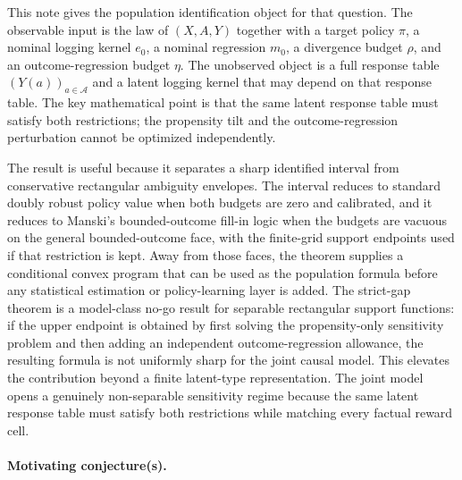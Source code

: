 \documentclass[11pt]{article}
\theoremstyle{definition}
\theoremstyle{plain}
\theoremstyle{remark}
\begin{document}
This note gives the population identification object for that question.  The
observable input is the law of $(X,A,Y)$ together with a target policy
$\pi$, a nominal logging kernel $e_0$, a nominal regression $m_0$, a divergence
budget $\rho$, and an outcome-regression budget $\eta$.  The unobserved object
is a full response table $(Y(a))_{a\in\mathcal A}$ and a latent logging kernel
that may depend on that response table.  The key mathematical point is that the
same latent response table must satisfy both restrictions; the propensity tilt
and the outcome-regression perturbation cannot be optimized independently.

The result is useful because it separates a sharp identified interval from
conservative rectangular ambiguity envelopes.  The interval reduces to standard
doubly robust policy value when both budgets are zero and calibrated, and it
reduces to Manski's bounded-outcome fill-in logic when the budgets are vacuous
on the general bounded-outcome face, with the finite-grid support endpoints
used if that restriction is kept.
Away from those faces, the theorem supplies a conditional convex program that
can be used as the population formula before any statistical estimation or
policy-learning layer is added.  The strict-gap theorem is a model-class
no-go result for separable rectangular support functions: if the upper endpoint
is obtained by first solving the propensity-only sensitivity problem and then
adding an independent outcome-regression allowance, the resulting formula is
not uniformly sharp for the joint causal model.  This elevates the contribution
beyond a finite latent-type representation.  The joint model opens a genuinely
non-separable sensitivity regime because the same latent response table must
satisfy both restrictions while matching every factual reward cell.

\paragraph{Motivating conjecture(s).}
\label{conj:sharp-interval}
\end{document}
